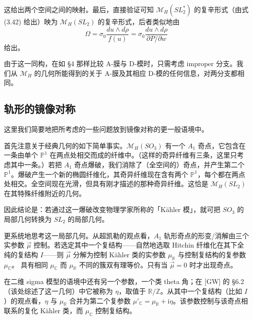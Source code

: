 这给出两个空间之间的映射。最后，直接验证可知 $\mathcal{M}_H(SL_2^*)$ 的复辛形式（由式 (3.42) 给出）映为 $\mathcal{M}_H(SL_2)$ 的复辛形式，后者类似地由
\begin{equation}\tag{3.57}
\Omega=\sigma_0\frac{du\wedge d\rho}{f(u)}=\sigma_0\frac{du\wedge d\rho}{\partial P/\partial w}
\end{equation}
给出。

由于这一同构，在如 §4 那样比较 A-膜与 D-模时，只需考虑 improper 分支。我们从 $\mathcal{M}_H$ 的几何所能得到的关于 A-膜及其相应 D-模的任何信息，对两分支都相同。

\subsection{轨形的镜像对称}

这里我们简要地把所考虑的一些问题放到镜像对称的更一般语境中。

首先注意关于经典几何的如下简单事实。$\mathcal{M}_H(SO_3)$ 有一个 $A_1$ 奇点，它包含在一条由单个 $\mathbb{P}^1$ 在两点处相交而成的纤维中。（这样的奇异纤维有三条，这里只考虑其中一条。）若把 $A_1$ 奇点爆破，我们消除了（全空间的）奇点，并产生第二个 $\mathbb{P}^1$。爆破产生一个新的椭圆纤维化，其奇异纤维现在含有两个 $\mathbb{P}^1$，每个都在两点处相交。全空间现在光滑，但具有刚才描述的那种奇异纤维。这恰是 $\mathcal{M}_H(SL_2)$ 在其特殊纤维附近的几何。

因此结论是：若通过这一爆破改变物理学家所称的「Kähler 模」，就可把 $SO_3$ 的局部几何转换为 $SL_2$ 的局部几何。

更系统地思考这一局部几何。从超凯勒的观点看，$A_1$ 轨形奇点的形变/消解由三个实参数 $\vec\mu$ 控制。若选定其中一个复结构——自然地选取 Hitchin 纤维化在其下全纯的复结构 $I$——则 $\vec\mu$ 分解为控制 Kähler 类的实参数 $\mu_{\mathbb{R}}$ 与控制复结构的复参数 $\mu_{\mathbb{C}}$。
具有相同 $\mu_{\mathbb{C}}$ 而 $\mu_{\mathbb{R}}$ 不同的簇双有理等价。只有当 $\vec\mu=0$ 时才出现奇点。

在二维 sigma 模型的语境中还有另一个参数，一个类 theta 角；在 [GW] 的 §6.2（该处综述了这一几何）中它被称为 $\eta$，取值于 $\mathbb{R}/\mathbb{Z}$。从其中一个复结构（比如 $I$）的观点看，$\eta$ 与 $\mu_{\mathbb{R}}$ 合并为第二个复参数 $\mu'_{\mathbb{C}}=\mu_{\mathbb{R}}+\mathrm{i}\eta$。该参数控制与该奇点相联系的复化 Kähler 类，而 $\mu_{\mathbb{C}}$ 控制复结构。

